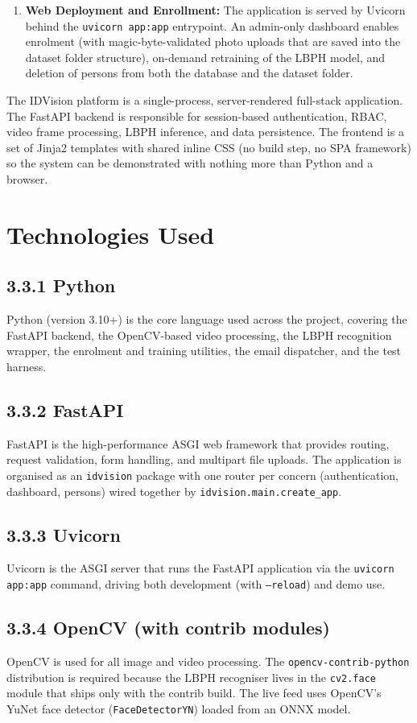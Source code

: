 \documentclass[11pt]{report}
\begin{document}
\begin{enumerate}
    \item \textbf{Web Deployment and Enrollment:} The application is served by Uvicorn behind the \texttt{uvicorn app:app} entrypoint. An admin-only dashboard enables enrolment (with magic-byte-validated photo uploads that are saved into the dataset folder structure), on-demand retraining of the LBPH model, and deletion of persons from both the database and the dataset folder.
\end{enumerate}
The IDVision platform is a single-process, server-rendered full-stack application. The FastAPI backend is responsible for session-based authentication, RBAC, video frame processing, LBPH inference, and data persistence. The frontend is a set of Jinja2 templates with shared inline CSS (no build step, no SPA framework) so the system can be demonstrated with nothing more than Python and a browser.
\section*{Technologies Used}

\subsection*{3.3.1 Python}
Python (version 3.10+) is the core language used across the project, covering the FastAPI backend, the OpenCV-based video processing, the LBPH recognition wrapper, the enrolment and training utilities, the email dispatcher, and the test harness.

\subsection*{3.3.2 FastAPI}
FastAPI is the high-performance ASGI web framework that provides routing, request validation, form handling, and multipart file uploads. The application is organised as an \texttt{idvision} package with one router per concern (authentication, dashboard, persons) wired together by \texttt{idvision.main.create\_app}.

\subsection*{3.3.3 Uvicorn}
Uvicorn is the ASGI server that runs the FastAPI application via the \texttt{uvicorn app:app} command, driving both development (with \texttt{--reload}) and demo use.

\subsection*{3.3.4 OpenCV (with contrib modules)}
OpenCV is used for all image and video processing. The \texttt{opencv-contrib-python} distribution is required because the LBPH recogniser lives in the \texttt{cv2.face} module that ships only with the contrib build. The live feed uses OpenCV's YuNet face detector (\texttt{FaceDetectorYN}) loaded from an ONNX model.
\end{document}
